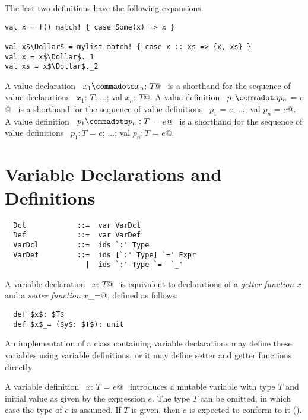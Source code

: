 The last two definitions have the following expansions.
\begin{lstlisting}
val x = f() match! { case Some(x) => x }

val x$\Dollar$ = mylist match! { case x :: xs => {x, xs} }
val x = x$\Dollar$._1 
val xs = x$\Dollar$._2 
\end{lstlisting}

A value declaration ~\lstinline@val $x_1 \commadots x_n$: $T$@~
is a
shorthand for the sequence of value declarations
~\lstinline@val $x_1$: $T$; ...; val $x_n$: $T$@.
A value definition ~\lstinline@val $p_1 \commadots p_n$ = $e$@~
is a
shorthand for the sequence of value definitions
~\lstinline@val $p_1$ = $e$; ...; val $p_n$ = $e$@.
A value definition ~\lstinline@val $p_1 \commadots p_n: T$ = $e$@~
is a
shorthand for the sequence of value definitions
~\lstinline@val $p_1: T$ = $e$; ...; val $p_n: T$ = $e$@.

\section{Variable Declarations and Definitions}
\label{sec:vardef}

\syntax\begin{lstlisting}
  Dcl            ::=  var VarDcl
  Def            ::=  var VarDef
  VarDcl         ::=  ids `:' Type
  VarDef         ::=  ids [`:' Type] `=' Expr
                   |  ids `:' Type `=' `_'
\end{lstlisting}

A variable declaration ~\lstinline@var $x$: $T$@~ is equivalent to declarations
of a {\em getter function} $x$ and a {\em setter function}
\lstinline@$x$_=@, defined as follows:

\begin{lstlisting}
  def $x$: $T$ 
  def $x$_= ($y$: $T$): unit
\end{lstlisting}

An implementation of a class containing variable declarations
may define these variables using variable definitions, or it may
define setter and getter functions directly.

A variable definition ~\lstinline@var $x$: $T$ = $e$@~ introduces a
mutable variable with type $T$ and initial value as given by the
expression $e$. The type $T$ can be omitted, in which case the type of
$e$ is assumed. If $T$ is given, then $e$ is expected to conform to it
().

